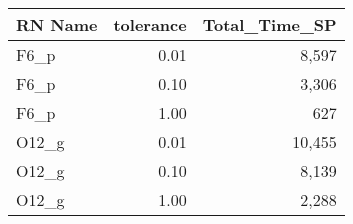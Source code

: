 \begin{tabular}{lrr}
\toprule
RN Name &  tolerance & Total_Time_SP \\
\midrule
  F6\_p &       0.01 &         8,597 \\
  F6\_p &       0.10 &         3,306 \\
  F6\_p &       1.00 &           627 \\
 O12\_g &       0.01 &        10,455 \\
 O12\_g &       0.10 &         8,139 \\
 O12\_g &       1.00 &         2,288 \\
\bottomrule
\end{tabular}
